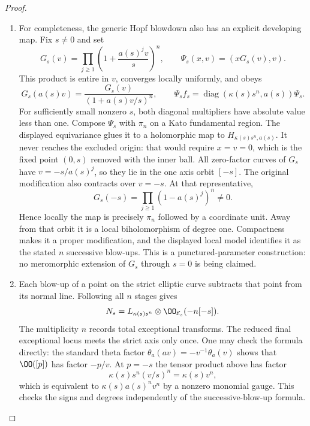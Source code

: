 \begin{proof}
\begin{enumerate}[label=\arabic*.,leftmargin=*]
\item For completeness, the generic Hopf blowdown also has an explicit
developing map. Fix $s\ne0$ and set
\[
 G_s(v)=\prod_{j\ge1}\left(1+\frac{a(s)^j v}{s}\right)^n,
       \qquad
 \Psi_s(x,v)=(xG_s(v),v).
\]
This product is entire in $v$, converges locally uniformly, and obeys
\[
 G_s(a(s)v)=\frac{G_s(v)}{(1+a(s)v/s)^n},\qquad
 \Psi_s f_s=\operatorname{diag}(\kappa(s)s^n,a(s))\Psi_s.
\]
For sufficiently small nonzero $s$, both diagonal multipliers have
absolute value less than one. Compose $\Psi_s$ with $\pi_n$ on a
Kato fundamental region. The displayed equivariance glues it to a
holomorphic map to $H_{\kappa(s)s^n,a(s)}$.
It never reaches the excluded origin: that would require
$x=v=0$, which is the fixed point $(0,s)$ removed with the inner ball.
All zero-factor curves of $G_s$ have
$v=-s/a(s)^j$, so they lie in the one axis orbit $[-s]$.
The original modification also contracts over $v=-s$.
At that representative,
\[
 G_s(-s)=\prod_{j\ge1}(1-a(s)^j)^n\ne0.
\]
Hence locally the map is precisely $\pi_n$ followed by a coordinate
unit. Away from that orbit it is a local biholomorphism of degree
one. Compactness makes it a proper modification, and the displayed
local model identifies it as the stated $n$ successive blow-ups.
This is a punctured-parameter construction: no meromorphic extension
of $G_s$ through $s=0$ is being claimed.

\item Each blow-up of a point on the strict elliptic curve subtracts that
point from its normal line. Following all $n$ stages gives
\[
 N_s=L_{\kappa(s)s^n}\otimes\OO_{\mathcal E_s}(-n[-s]).
\]
The multiplicity $n$ records total exceptional transforms.
The reduced final exceptional locus meets the strict axis only once.
One may check the formula directly: the standard theta factor
$\theta_a(av)=-v^{-1}\theta_a(v)$ shows that $\OO([p])$
has factor $-p/v$. At $p=-s$ the tensor product above has factor
\[
 \kappa(s)s^n(v/s)^n=\kappa(s)v^n,
\]
which is equivalent to $\kappa(s)a(s)^n v^n$ by a nonzero monomial
gauge. This checks the signs and degrees independently of the
successive-blow-up formula.


\end{enumerate}
\end{proof}
